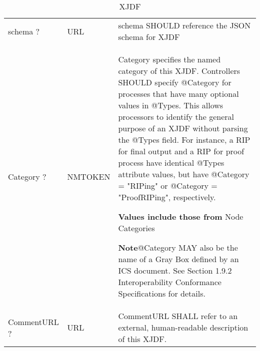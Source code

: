\begin{table}[htb]
\begin{tabular}{l l p{6cm}}
    
    schema ?  & 
    URL &  
    schema SHOULD reference the JSON schema for XJDF \\

    Category ? & 
    NMTOKEN & 
    Category specifies the named category of this XJDF. Controllers SHOULD specify @Category for processes that have many optional values in @Types. This allows processors to identify the general purpose of an XJDF without parsing the @Types field. For instance, a RIP for final output and a RIP for proof process have identical @Types attribute values, but have @Category = "RIPing" or @Category = "ProofRIPing", respectively.
    
    \textbf{Values include those from} Node Categories

    \textbf{Note}@Category MAY also be the name of a Gray Box defined by an ICS document. See Section 1.9.2 Interoperability Conformance Specifications for details. \\

    CommentURL ? &
    URL &
    CommentURL SHALL refer to an external, human-readable description of this XJDF. \\
\end{tabular}
\caption{XJDF}
\end{table}
